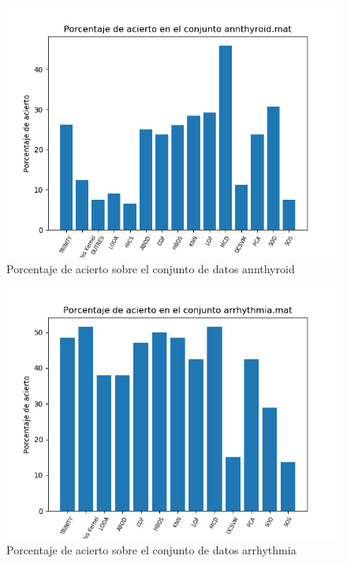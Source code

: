 \begin{figure}[H]
	\centering
	\label{annthyroid_accuracy}
	\includegraphics[scale=0.7]{imagenes/imgs-exp1/accuracy/annthyroid}
	\caption{Porcentaje de acierto sobre el conjunto de datos annthyroid}
\end{figure}

\begin{figure}[H]
	\centering
	\label{arrhythmia_accuracy}
	\includegraphics[scale=0.7]{imagenes/imgs-exp1/accuracy/arrhythmia}
	\caption{Porcentaje de acierto sobre el conjunto de datos arrhythmia}
\end{figure}

